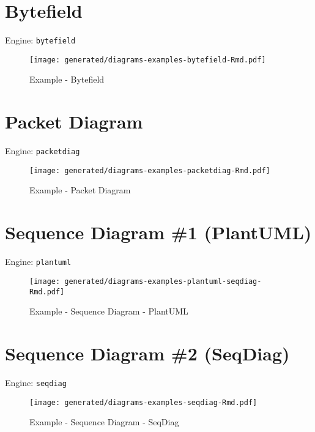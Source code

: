 \documentclass[12pt,a4paper,12pt,oneside,openany]{book}
\begin{document}
\newpage

\section{Bytefield}\label{bytefield}

Engine: \texttt{bytefield}

\begin{figure}
\centering
\texttt{[image: generated/diagrams-examples-bytefield-Rmd.pdf]}
\caption{Example - Bytefield}
\end{figure}

\newpage

\section{Packet Diagram}\label{packet-diagram}

Engine: \texttt{packetdiag}

\begin{figure}
\centering
\texttt{[image: generated/diagrams-examples-packetdiag-Rmd.pdf]}
\caption{Example - Packet Diagram}
\end{figure}

\newpage

\section{Sequence Diagram \#1 (PlantUML)}\label{sequence-diagram-1-plantuml}

Engine: \texttt{plantuml}

\begin{figure}
\centering
\texttt{[image: generated/diagrams-examples-plantuml-seqdiag-Rmd.pdf]}
\caption{Example - Sequence Diagram - PlantUML}
\end{figure}

\newpage

\section{Sequence Diagram \#2 (SeqDiag)}\label{sequence-diagram-2-seqdiag}

Engine: \texttt{seqdiag}

\begin{figure}
\centering
\texttt{[image: generated/diagrams-examples-seqdiag-Rmd.pdf]}
\caption{Example - Sequence Diagram - SeqDiag}
\end{figure}

\newpage
\end{document}

